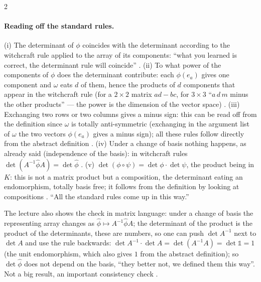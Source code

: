 \begin{paracol}{2}
\paragraph{Reading off the standard rules.} (i) The determinant of $\phi$ coincides with the determinant according to the witchcraft rule applied to the array of its components: ``what you learned is correct, the determinant rule will coincide'' . (ii) To what power of the components of $\phi$ does the determinant contribute: each $\phi(e_a)$ gives one
component and $\omega$ eats $d$ of them, hence the products of $d$ components that appear in the witchcraft rule (for a $2\times2$ matrix $ad-bc$, for $3\times3$ ``$a\,d\,m$ minus the other products'' --- the power is the dimension of the vector space) .
(iii) Exchanging two rows or two columns gives a minus sign: this can be read off from the definition since $\omega$ is totally anti-symmetric (exchanging in the argument list of $\omega$ the two vectors $\phi(e_a)$ gives a minus sign); all these rules follow directly from the abstract definition .
(iv) Under a change of basis nothing happens, as already said (independence of the basis): in witchcraft rules $\det(A^{-1}\hat\phi A)=\det\hat\phi$ . (v) $\det(\phi\circ\psi)=\det\phi\cdot\det\psi$, the product being in $K$: this is not a matrix product but a composition, the determinant eating an endomorphism, totally basis free; it
follows from the definition by looking at compositions . ``All the standard rules come up in this way.''

\begin{secondary}
The lecture also shows the check in matrix language: under a change of basis the representing array changes as $\hat\phi\mapsto A^{-1}\hat\phi A$; the determinant of the product is the product of the determinants, these are numbers, so one can push $\det A^{-1}$ next to $\det A$ and use the rule backwards: $\det A^{-1}\cdot\det A=\det(A^{-1}A)=\det\mathbb 1=1$ (the unit endomorphism, which also gives $1$ from the abstract
definition); so $\det\hat\phi$ does not depend on the basis, ``they better not, we defined them this way''. Not a big result, an important consistency check .
\end{secondary}


\end{paracol}
